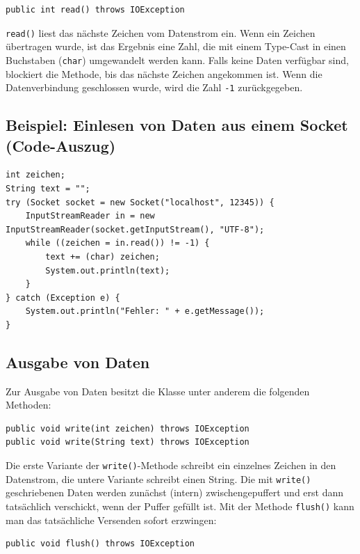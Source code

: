 \begin{lstlisting}
public int read() throws IOException
\end{lstlisting}

\lstinline|read()| liest das nächste Zeichen vom Datenstrom ein. Wenn ein
Zeichen übertragen wurde, ist das Ergebnis eine Zahl, die mit einem Type-Cast
in einen Buchstaben (\lstinline|char|) umgewandelt werden kann. Falls keine
Daten verfügbar sind, blockiert die Methode, bis das nächste Zeichen angekommen
ist. Wenn die Datenverbindung geschlossen wurde, wird die Zahl \lstinline|-1|
zurückgegeben.

\subsection{Beispiel: Einlesen von Daten aus einem Socket (Code-Auszug)}

\begin{lstlisting}
int zeichen;
String text = "";
try (Socket socket = new Socket("localhost", 12345)) {
    InputStreamReader in = new InputStreamReader(socket.getInputStream(), "UTF-8"); 
    while ((zeichen = in.read()) != -1) {
        text += (char) zeichen;
        System.out.println(text);
    }	
} catch (Exception e) {
    System.out.println("Fehler: " + e.getMessage());
}
\end{lstlisting}

\subsection{Ausgabe von Daten}

Zur Ausgabe von Daten besitzt die Klasse  unter
anderem die folgenden Methoden:

\begin{lstlisting}
public void write(int zeichen) throws IOException
public void write(String text) throws IOException
\end{lstlisting}

Die erste Variante der \lstinline|write()|-Methode schreibt ein einzelnes
Zeichen in den Datenstrom, die untere Variante schreibt einen String. Die mit
\lstinline|write()| geschriebenen Daten werden zunächst (intern)
zwischengepuffert und erst dann tatsächlich verschickt, wenn der Puffer gefüllt
ist. Mit der Methode \lstinline|flush()| kann man das tatsächliche Versenden
sofort erzwingen:

\begin{lstlisting}
public void flush() throws IOException
\end{lstlisting}

